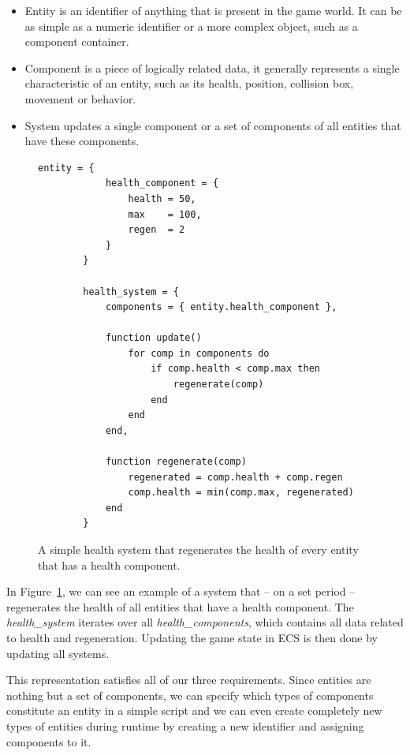 \begin{itemize}
    \item Entity is an identifier of anything that is present in the game world. It can be as simple as a numeric 
        identifier or a more complex object, such as a component container.
    \item Component is a piece of logically related data, it generally represents a single characteristic 
        of an entity, such as its health, position, collision box, movement or behavior.
    \item System updates a single component or a set of components of all entities that have these components.
\end{itemize}

\begin{figure}[h]
    \centering
    \begin{lstlisting}[frame=single]
        entity = {
            health_component = {
                health = 50,
                max    = 100,
                regen  = 2
            }
        }

        health_system = {
            components = { entity.health_component },

            function update()
                for comp in components do
                    if comp.health < comp.max then
                        regenerate(comp)
                    end
                end
            end,

            function regenerate(comp)
                regenerated = comp.health + comp.regen
                comp.health = min(comp.max, regenerated)
            end
        }
    \end{lstlisting}
    \caption{A simple health system that regenerates the health of every entity
            that has a health component.}
    \label{ecs-example}
\end{figure}

In Figure~\ref{ecs-example}, we can see an example of a system that -- on a set period -- regenerates the health of all entities
that have a health component. The \emph{health\_system} iterates over all \emph{health\_components}, which contains all
data related to health and regeneration. Updating the game state in ECS is then done by updating all systems.

This representation satisfies all of our three requirements. Since entities are nothing but a set of components, we can specify
which types of components constitute an entity in a simple script and we can even create completely new types of entities
during runtime by creating a new identifier and assigning components to it.


